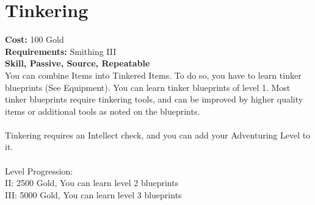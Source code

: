 \section{Tinkering}
\textbf{Cost:} 100 Gold\\
\textbf{Requirements:} Smithing III\\
\textbf{Skill, Passive, Source, Repeatable}\\
You can combine Items into Tinkered Items. To do so, you have to learn tinker blueprints (See Equipment). You can learn tinker blueprints of level 1. Most tinker blueprints require tinkering tools, and can be improved by higher quality items or additional tools as noted on the blueprints.\\
\\
Tinkering requires an Intellect check, and you can add your Adventuring Level to it.\\
\\
Level Progression:\\
II: 2500 Gold, You can learn level 2 blueprints\\
III: 5000 Gold, You can learn level 3 blueprints\\
